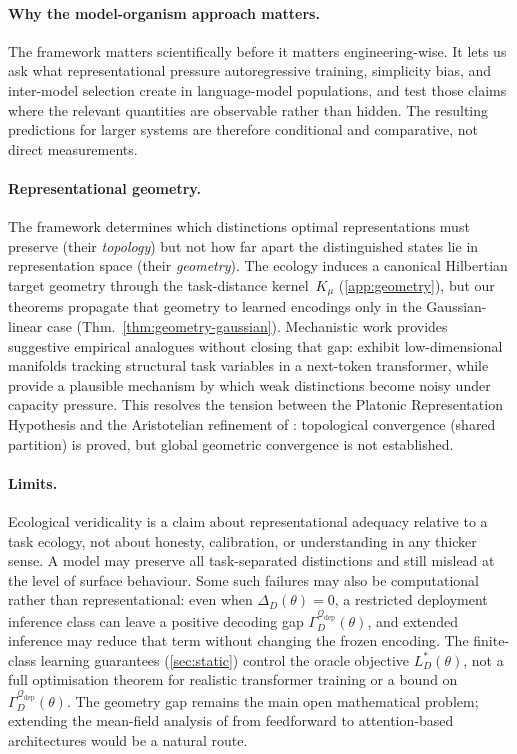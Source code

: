 \documentclass[twoside,11pt]{article}
\newcommand{\thmref}[1]{Thm.~\ref{#1}}
\begin{document}
\paragraph{Why the model-organism approach matters.}
The framework matters scientifically before it matters engineering-wise. It lets us ask what representational pressure autoregressive training, simplicity bias, and inter-model selection create in language-model populations, and test those claims where the relevant quantities are observable rather than hidden. The resulting predictions for larger systems are therefore conditional and comparative, not direct measurements.

\paragraph{Representational geometry.}
The framework determines which distinctions optimal representations must preserve (their \emph{topology}) but not how far apart the distinguished states lie in representation space (their \emph{geometry}). The ecology induces a canonical Hilbertian target geometry through the task-distance kernel~$K_\mu$ (\cref{app:geometry}), but our theorems propagate that geometry to learned encodings only in the Gaussian-linear case (\thmref{thm:geometry-gaussian}). Mechanistic work provides suggestive empirical analogues without closing that gap: \citet{gurnee_etal_2025_linebreaks} exhibit low-dimensional manifolds tracking structural task variables in a next-token transformer, while \citet{elhage_etal_2022_superposition} provide a plausible mechanism by which weak distinctions become noisy under capacity pressure. This resolves the tension between the Platonic Representation Hypothesis \citep{huh_etal_2024} and the Aristotelian refinement of \citet{groeger_etal_2026}: topological convergence (shared partition) is proved, but global geometric convergence is not established.

\paragraph{Limits.}
Ecological veridicality is a claim about representational adequacy relative to a task ecology, not about honesty, calibration, or understanding in any thicker sense. A model may preserve all task-separated distinctions and still mislead at the level of surface behaviour. Some such failures may also be computational rather than representational: even when $\Delta_D(\theta)=0$, a restricted deployment inference class can leave a positive decoding gap $\Gamma_D^{\mathcal{Q}_{\mathrm{dep}}}(\theta)$, and extended inference may reduce that term without changing the frozen encoding. The finite-class learning guarantees (\cref{sec:static}) control the oracle objective $L_D^*(\theta)$, not a full optimisation theorem for realistic transformer training or a bound on $\Gamma_D^{\mathcal{Q}_{\mathrm{dep}}}(\theta)$. The geometry gap remains the main open mathematical problem; extending the mean-field analysis of \citet{wang_johnston_fusi_2025} from feedforward to attention-based architectures would be a natural route.
\end{document}
